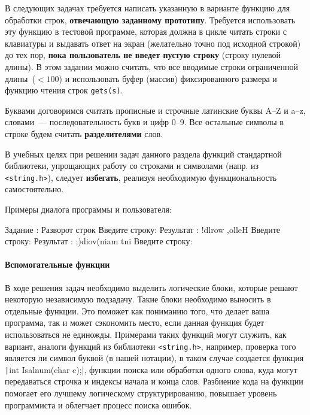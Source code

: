 
В следующих задачах требуется написать указанную в варианте функцию для
обработки строк, \textbf{отвечающую заданному прототипу}. Требуется использовать
эту функцию в тестовой программе, которая должна в цикле читать строки с
клавиатуры и выдавать ответ на экран (желательно точно под исходной строкой)
до тех пор, \textbf{пока пользователь не введет пустую строку} (строку нулевой длины).
В этом задании можно считать, что все вводимые строки ограниченной
длины~($<100$) и использовать буфер (массив) фиксированного размера и
функцию чтения строк \texttt{gets(s)}.

Буквами договоримся считать прописные и строчные латинские буквы 
A--Z и a--z, словами~--- последовательность букв и цифр 0--9. Все остальные
символы в строке будем считать \textbf{разделителями} слов.

В учебных целях при решении задач данного раздела функций стандартной
библиотеки, упрощающих работу со строками и символами (напр. из 
\texttt{<string.h>}), следует \textbf{избегать}, реализуя необходимую
функциональность самостоятельно.

Примеры диалога программы и пользователя:

\begin{zzoutput}
  Задание : Разворот строк
  Введите строку: 
  Результат     : !dlrow ,olleH
  Введите строку: 
  Результат     : ;)diov(niam tni
  Введите строку: \zzuser{ }
\end{zzoutput}


\zzsectionCOMMENTS

\paragraph{Вспомогательные функции}
В ходе решения задач необходимо выделить логические блоки, которые решают некоторую независимую подзадачу. Такие блоки необходимо выносить в отдельные функции. Это поможет как пониманию того, что делает ваша программа, так и может сэкономить место, если данная функция будет использоваться не единожды. Примерами таких функций могут служить, как вариант, аналоги функций из библиотеки \texttt{<string.h>}, например, проверка того является ли символ буквой (в нашей нотации), в таком случае создается функция \texttt|int Isalnum(char c);|, функции поиска или обработки одного слова, куда могут передаваться строчка и индексы начала и конца слов.
Разбиение кода на функции помогает его лучшему логическому структурированию, повышает уровень программиста и облегчает процесс поиска ошибок.


